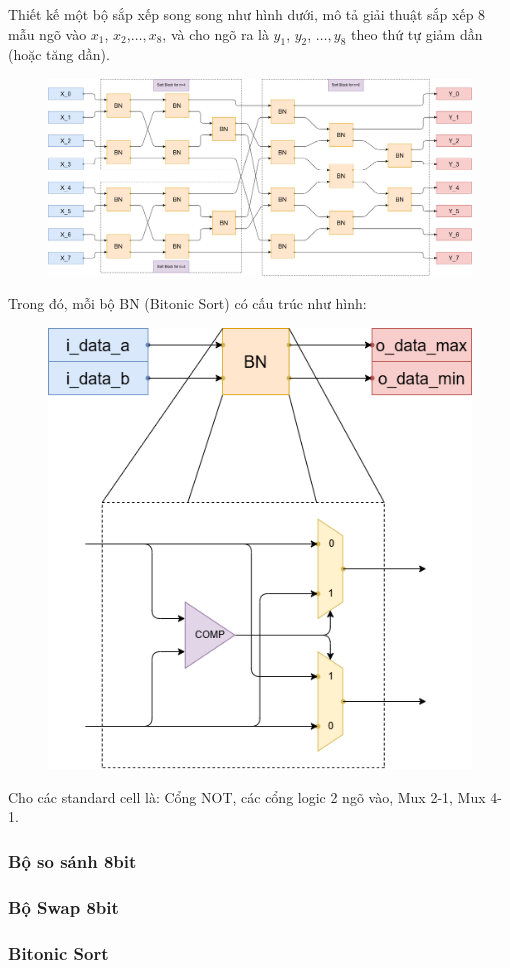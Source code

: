 
Thiết kế một bộ sắp xếp song song như hình dưới, mô tả giải thuật sắp xếp 8 mẫu ngõ vào $x_{1}$, $x_{2}$,$\dots, x_{8}$, và cho ngõ ra là $y_{1}$, $y_{2}$, $\dots, y_{8}$ theo thứ tự giảm dần (hoặc tăng dần).

\begin{figure}[H]
	\centering
	\includegraphics[width=\linewidth]{./my-chapters/my-diagrams/Question6/debai.png}
\end{figure}

Trong đó, mỗi bộ BN (Bitonic Sort) có cấu trúc như hình:

\begin{figure}[H]
	\centering
	\includegraphics[width=.4\linewidth]{./my-chapters/my-diagrams/Question6/Swap_and_compare.png}
\end{figure}

Cho các standard cell là: Cổng NOT, các cổng logic 2 ngõ vào, Mux 2-1, Mux 4-1.


\subsubsection*{Bộ so sánh 8bit}



\subsubsection*{Bộ Swap 8bit}

\subsubsection*{Bitonic Sort}